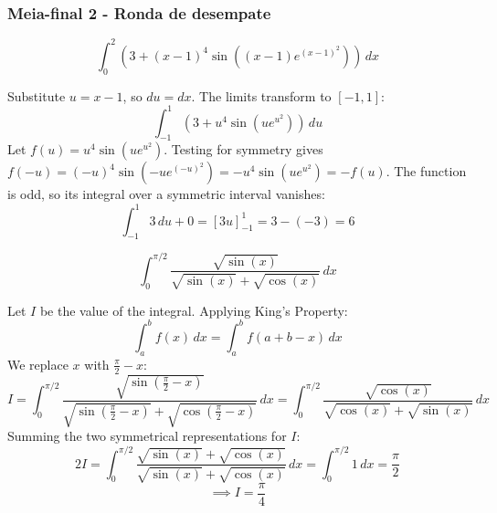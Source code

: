 \subsubsection*{Meia-final 2 - Ronda de desempate}
\begin{questions}
    \question \[ \int_0^2 \left( 3 + (x - 1)^4 \sin\left((x - 1)e^{(x-1)^2}\right) \right) \,dx \]
    \begin{solution}
        Substitute $u = x - 1$, so $du = dx$. The limits transform to $[-1, 1]$:
        \[ \int_{-1}^1 \left( 3 + u^4 \sin\left(u e^{u^2}\right) \right) \,du \]
        Let $f(u) = u^4 \sin\left(u e^{u^2}\right)$. Testing for symmetry gives $f(-u) = (-u)^4 \sin\left(-u e^{(-u)^2}\right) = -u^4 \sin\left(u e^{u^2}\right) = -f(u)$. The function is odd, so its integral over a symmetric interval vanishes:
        \[ \int_{-1}^1 3 \,du + 0 = [3u]_{-1}^1 = 3 - (-3) = 6 \]
    \end{solution}

    \question \[ \int_0^{\pi/2} \frac{\sqrt{\sin(x)}}{\sqrt{\sin(x)} + \sqrt{\cos(x)}} \,dx \]
    \begin{solution}
        Let $I$ be the value of the integral. Applying King's Property:
        \[ \int_a^b f(x) \,dx = \int_a^b f(a+b-x) \,dx \]
        We replace $x$ with $\frac{\pi}{2} - x$:
        \[ I = \int_0^{\pi/2} \frac{\sqrt{\sin\left(\frac{\pi}{2}-x\right)}}{\sqrt{\sin\left(\frac{\pi}{2}-x\right)} + \sqrt{\cos\left(\frac{\pi}{2}-x\right)}} \,dx = \int_0^{\pi/2} \frac{\sqrt{\cos(x)}}{\sqrt{\cos(x)} + \sqrt{\sin(x)}} \,dx \]
        Summing the two symmetrical representations for $I$:
        \[ 2I = \int_0^{\pi/2} \frac{\sqrt{\sin(x)} + \sqrt{\cos(x)}}{\sqrt{\sin(x)} + \sqrt{\cos(x)}} \,dx = \int_0^{\pi/2} 1 \,dx = \frac{\pi}{2} \]
        \[ \implies I = \frac{\pi}{4} \]
    \end{solution}
\end{questions}

